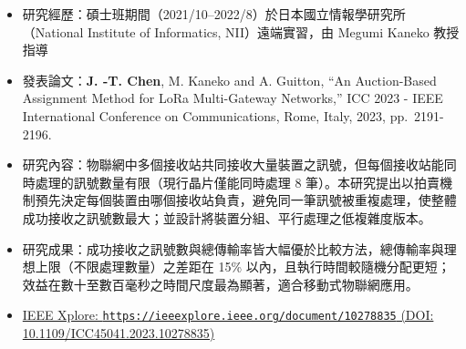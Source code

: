 \documentclass[11pt,fontset=none]{ctexart}
\newcommand{\paperlink}[2]{\href{#1}{\footnotesize IEEE Xplore: \texttt{#1} (DOI: #2)}}
\begin{document}
\begin{itemize}
  \item 研究經歷：碩士班期間（2021/10--2022/8）於日本國立情報學研究所（National Institute of Informatics, NII）遠端實習，由 Megumi Kaneko 教授指導
  \item 發表論文：\textbf{J. -T. Chen}, M. Kaneko and A. Guitton, ``An Auction-Based Assignment Method for LoRa Multi-Gateway Networks,'' ICC 2023 - IEEE International Conference on Communications, Rome, Italy, 2023, pp.~2191-2196.
  \item 研究內容：物聯網中多個接收站共同接收大量裝置之訊號，但每個接收站能同時處理的訊號數量有限（現行晶片僅能同時處理 8 筆）。本研究提出以拍賣機制預先決定每個裝置由哪個接收站負責，避免同一筆訊號被重複處理，使整體成功接收之訊號數最大；並設計將裝置分組、平行處理之低複雜度版本。
  \item 研究成果：成功接收之訊號數與總傳輸率皆大幅優於比較方法，總傳輸率與理想上限（不限處理數量）之差距在 15\% 以內，且執行時間較隨機分配更短；效益在數十至數百毫秒之時間尺度最為顯著，適合移動式物聯網應用。
  \item \paperlink{https://ieeexplore.ieee.org/document/10278835}{10.1109/ICC45041.2023.10278835}
\end{itemize}
\end{document}

